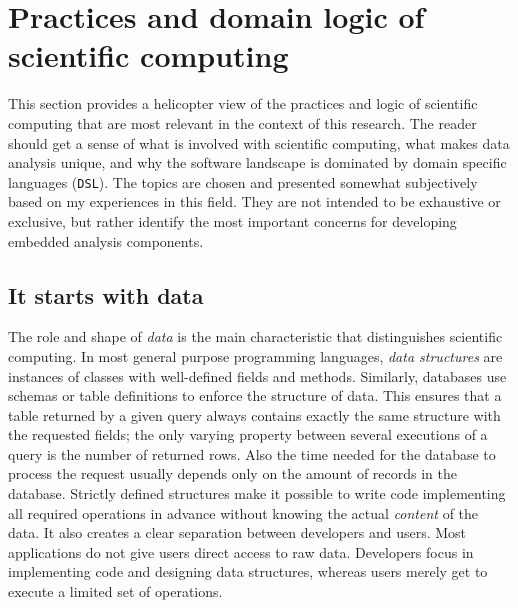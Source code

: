 
\section{Practices and domain logic of scientific computing}


This section provides a helicopter view of the practices and logic of scientific computing that are most relevant in the context of this research. The reader should get a sense of what is involved with scientific computing, what makes data analysis unique, and why the software landscape is dominated by domain specific languages (\texttt{DSL}). The topics are chosen and presented somewhat subjectively based on my experiences in this field. They are not intended to be exhaustive or exclusive, but rather identify the most important concerns for developing embedded analysis components. 

\subsection{It starts with data}

The role and shape of \emph{data} is the main characteristic that distinguishes scientific computing. In most general purpose programming languages, \emph{data structures} are instances of classes with well-defined fields and methods. Similarly, databases use schemas or table definitions to enforce the structure of data. This ensures that a table returned by a given \SQL query always contains exactly the same structure with the requested fields; the only varying property between several executions of a query is the number of returned rows. Also the time needed for the database to process the request usually depends only on the amount of records in the database.
Strictly defined structures make it possible to write code implementing all required operations in advance without knowing the actual \emph{content} of the data. It also creates a clear separation between developers and users. Most applications do not give users direct access to raw data. Developers focus in implementing code and designing data structures, whereas users merely get to execute a limited set of operations.

